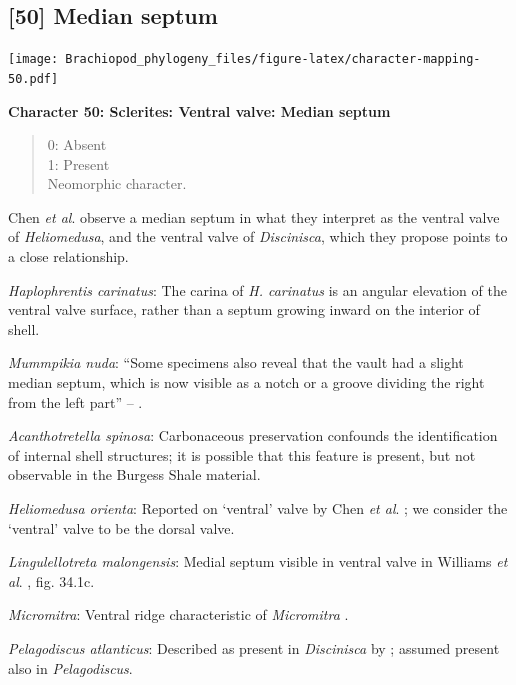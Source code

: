 \documentclass[]{book}
\theoremstyle{definition}
\theoremstyle{definition}
\theoremstyle{definition}
\theoremstyle{remark}
\begin{document}
\hypertarget{median-septum}{%
\subsection*{{[}50{]} Median septum}\label{median-septum}}

\texttt{[image: Brachiopod\_phylogeny\_files/figure-latex/character-mapping-50.pdf]}

\textbf{Character 50: Sclerites: Ventral valve: Median septum}

\begin{quote}
0: Absent\\
1: Present\\
Neomorphic character.
\end{quote}

Chen \emph{et al}. \citeyearpar{Chen2007Reinterpretationof} observe a
median septum in what they interpret as the ventral valve of
\emph{Heliomedusa}, and the ventral valve of \emph{Discinisca}, which
they propose points to a close relationship.

\emph{Haplophrentis carinatus}: The carina of \emph{H. carinatus} is an
angular elevation of the ventral valve surface, rather than a septum
growing inward on the interior of shell.

\emph{Mummpikia nuda}: ``Some specimens also reveal that the vault had a
slight median septum, which is now visible as a notch or a groove
dividing the right from the left part'' --
\citet{Balthasar2008iMummpikia}.

\emph{Acanthotretella spinosa}: Carbonaceous preservation confounds the
identification of internal shell structures; it is possible that this
feature is present, but not observable in the Burgess Shale material.

\emph{Heliomedusa orienta}: Reported on `ventral' valve by Chen \emph{et
al}. \citeyearpar{Chen2007Reinterpretationof}; we consider the `ventral'
valve to be the dorsal valve.

\emph{Lingulellotreta malongensis}: Medial septum visible in ventral
valve in Williams \emph{et al}.
\citeyearpar{Williams2000BrachiopodaLinguliformea}, fig. 34.1c.

\emph{Micromitra}: Ventral ridge characteristic of \emph{Micromitra}
\citep{Skovsted2010EarlyCambrian}.

\emph{Pelagodiscus atlanticus}: Described as present in
\emph{Discinisca} by \citet{Chen2007Reinterpretationof}; assumed present
also in \emph{Pelagodiscus}.
\end{document}
